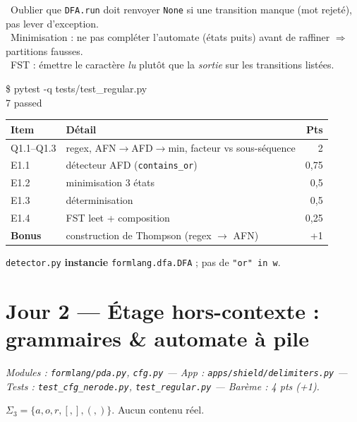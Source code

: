 \documentclass[11pt,a4paper]{scrartcl}
\begin{document}
\begin{notion}
\textbullet\ Oublier que \texttt{DFA.run} doit renvoyer \texttt{None} si une transition
manque (mot rejeté), pas lever d'exception.\\
\textbullet\ Minimisation : ne pas compléter l'automate (états puits) avant de raffiner
$\Rightarrow$ partitions fausses.\\
\textbullet\ FST : émettre le caractère \emph{lu} plutôt que la \emph{sortie} sur les
transitions listées.
\end{notion}

\begin{exemple}\ttfamily
\$ pytest -q tests/test\_regular.py\\ 7 passed
\end{exemple}

\begin{center}\small
\begin{tabular}{@{}llr@{}}
\toprule Item & Détail & Pts\\\midrule
Q1.1–Q1.3 & regex, AFN$\to$AFD$\to$min, facteur vs sous-séquence & 2\\
E1.1 & détecteur AFD (\texttt{contains\_or}) & 0,75\\
E1.2 & minimisation 3 états & 0,5\\
E1.3 & déterminisation & 0,5\\
E1.4 & FST leet + composition & 0,25\\
\textbf{Bonus} & construction de Thompson (regex $\to$ AFN) & +1\\
\bottomrule
\end{tabular}
\end{center}
\begin{gate}\texttt{detector.py} \textbf{instancie} \texttt{formlang.dfa.DFA} ; pas de \texttt{"or" in w}.\end{gate}
\clearpage
\section{Jour 2 — Étage hors-contexte : grammaires \& automate à pile}
\emph{Modules : \texttt{formlang/pda.py}, \texttt{cfg.py} — App : \texttt{apps/shield/delimiters.py}
— Tests : \texttt{test\_cfg\_nerode.py}, \texttt{test\_regular.py} — Barème : 4 pts (+1).}
\begin{ethique}$\Sigma_3=\{a,o,r,[,],(,)\}$. Aucun contenu réel.\end{ethique}
\end{document}
